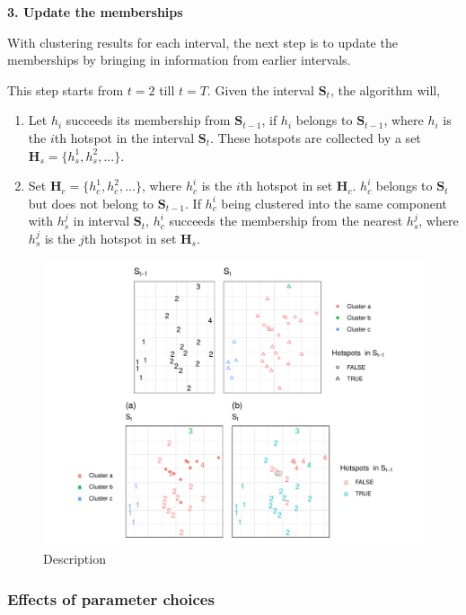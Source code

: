 \textbf{3. Update the memberships}

With clustering results for each interval, the next step is to update
the memberships by bringing in information from earlier intervals.

This step starts from \(t=2\) till \(t=T\). Given the interval
\(\boldsymbol{S}_t\), the algorithm will,

\begin{enumerate}
\def\labelenumi{(\alph{enumi})}
\item
  Let \(h_i\) succeeds its membership from \(\boldsymbol{S}_{t-1}\), if
  \(h_i\) belongs to \(\boldsymbol{S}_{t-1}\), where \(h_i\) is the
  \(i\)th hotspot in the interval \(\boldsymbol{S}_t\). These hotspots
  are collected by a set \(\boldsymbol{H}_s = \{h_s^1,h_s^2,...\}\).
\item
  Set \(\boldsymbol{H}_c = \{h_c^1,h_c^2,...\}\), where \(h_c^i\) is the
  \(i\)th hotspot in set \(\boldsymbol{H}_c\). \(h_c^i\) belongs to
  \(\boldsymbol{S}_t\) but does not belong to \(\boldsymbol{S}_{t-1}\).
  If \(h_c^i\) being clustered into the same component with \(h_s^j\) in
  interval \(\boldsymbol{S}_t\), \(h_c^i\) succeeds the membership from
  the nearest \(h_s^j\), where \(h_s^j\) is the \(j\)th hotspot in set
  \(\boldsymbol{H}_s\).
\end{enumerate}

\begin{Schunk}
\begin{figure}
\includegraphics[width=0.8\linewidth]{clustering_paper_files/figure-latex/step3figs-1} \caption[Description]{Description}\label{fig:step3figs}
\end{figure}
\end{Schunk}

\hypertarget{effects-of-parameter-choices}{%
\subsubsection{Effects of parameter
choices}\label{effects-of-parameter-choices}}

